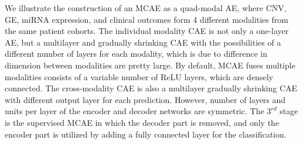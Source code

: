 \hspace*{3.5mm} We illustrate the construction of an MCAE as a quad-modal AE, where CNV, GE, miRNA expression, and clinical outcomes form 4 different modalities from the same patient cohorts. The individual modality CAE is not only a one-layer AE, but a multilayer and gradually shrinking CAE with the possibilities of a different number of layers for each modality, which is due to difference in dimension between modalities are pretty large. By default, MCAE fuses multiple modalities consists of a variable number of ReLU layers, which are densely connected. The cross-modality CAE is also a multilayer gradually shrinking CAE with different output layer for each prediction. However, number of layers and units per layer of the encoder and decoder networks are symmetric. The $3^{rd}$ stage is the supervised MCAE in which the decoder part is removed, and only the encoder part is utilized by adding a fully connected layer for the classification. %

